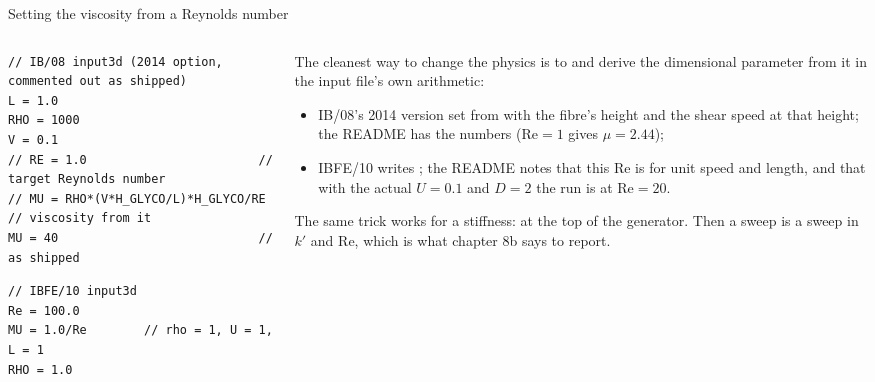 \documentclass[aspectratio=169,11pt]{beamer}
\begin{document}
\begin{frame}[fragile]{Setting the viscosity from a Reynolds number}
\label{fr:refrom}
\begin{columns}[T,onlytextwidth]
\begin{column}{0.5\textwidth}
\begin{lstlisting}[style=inputtiny]
// IB/08 input3d (2014 option, commented out as shipped)
L = 1.0
RHO = 1000
V = 0.1
// RE = 1.0                        // target Reynolds number
// MU = RHO*(V*H_GLYCO/L)*H_GLYCO/RE   // viscosity from it
MU = 40                            // as shipped
\end{lstlisting}
\begin{lstlisting}[style=inputtiny]
// IBFE/10 input3d
Re = 100.0
MU = 1.0/Re        // rho = 1, U = 1, L = 1
RHO = 1.0
\end{lstlisting}
\end{column}
\begin{column}{0.48\textwidth}
\small The cleanest way to change the physics is to  and derive the dimensional parameter from it in the input file's own arithmetic:
\begin{itemize}
  \item IB/08's 2014 version set  from  with the fibre's height and the shear speed at that height; the README has the numbers ($\mathrm{Re} = 1$ gives $\mu = 2.44$);
  \item IBFE/10 writes ; the README notes that this $\mathrm{Re}$ is for unit speed and length, and that with the actual $U = 0.1$ and $D = 2$ the run is at $\mathrm{Re} = 20$.
\end{itemize}
\small The same trick works for a stiffness:  at the top of the generator. Then a sweep is a sweep in $k'$ and $\mathrm{Re}$, which is what chapter 8b says to report.
\end{column}
\end{columns}
\end{frame}
\end{document}
